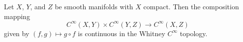 Let $X$, $Y$, and $Z$ be smooth manifolds with $X$ compact. Then the composition mapping
$$C^\infty(X, Y) \times C^\infty(Y, Z) \to C^\infty(X, Z)$$
given by $(f, g) \mapsto g \circ f$ is continuous in the Whitney $C^\infty$ topology.
